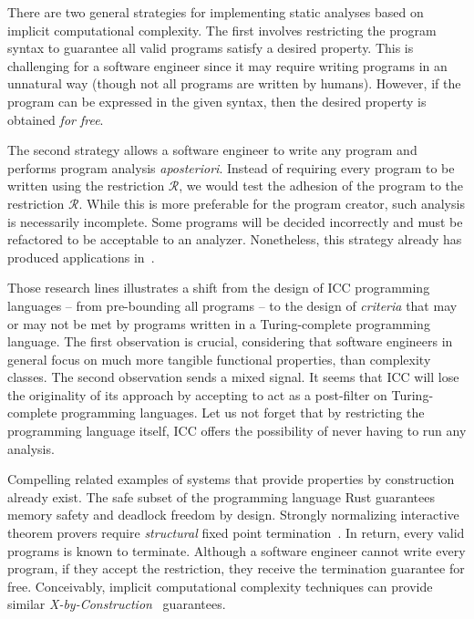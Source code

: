 There are two general strategies for implementing static analyses based on implicit computational complexity.
The first involves restricting the program syntax to guarantee all valid programs satisfy a desired property.
This is challenging for a software engineer since it may require writing programs in an unnatural way (though not all programs are written by humans).
However, if the program can be expressed in the given syntax, then the desired property is obtained \emph{for free}.

The second strategy allows a software engineer to write any program and performs program analysis \emph{aposteriori}.
Instead of requiring every program to be written using the restriction \(\mathcal{R}\),
we would test the adhesion of the program to the restriction \(\mathcal{R}\).
While this is more preferable for the program creator, such analysis is necessarily incomplete.
Some programs will be decided incorrectly and must be refactored to be acceptable to an analyzer.
Nonetheless, this strategy already has produced applications in~\textcite{moyen2016,moyen20172}.

Those research lines illustrates a shift from the design of ICC programming languages -- from pre-bounding all programs --
to the design of \emph{criteria} that may or may not be met by programs written in a Turing-complete programming language.
The first observation is crucial, considering that software engineers in general focus on much more tangible functional properties,
than complexity classes.
The second observation sends a mixed signal.
It seems that ICC will lose the originality of its approach by accepting to act as a post-filter on Turing-complete programming languages.
Let us not forget that by restricting the programming language itself, ICC offers the possibility of never having to run any analysis.

Compelling related examples of systems that provide properties by construction already exist.
The safe subset of the programming language Rust guarantees \eg memory safety and deadlock freedom by design.
Strongly normalizing interactive theorem provers require \emph{structural} fixed point termination~\cite{bertot2004}.
In return, every valid programs is known to terminate.
Although a software engineer cannot write every program, if they accept the restriction, they receive the termination guarantee for free.
Conceivably, implicit computational complexity techniques can provide similar \emph{X-by-Construction}~\cite{terbeek2018} guarantees.
